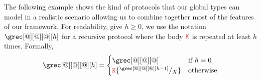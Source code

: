 

The following example shows the kind of protocols that our global
types can model in a realistic scenario allowing us to combine
together most of the features of our framework.
%
For readability, give $h \geq 0$, we use the notation
$\grec[@][@][@][h]$ for a recursive protocol where the body $\aK$ is
repeated at least $h$ times.
%
Formally,
\[
\grec[@][@][@][h] =
\begin{cases}
  \grec[@][@][@] & \text{if } h = 0
  \\
  \aK \sust{X}{\grec[@][@][@][h-1]} & \text{otherwise}
\end{cases}
\]
%
